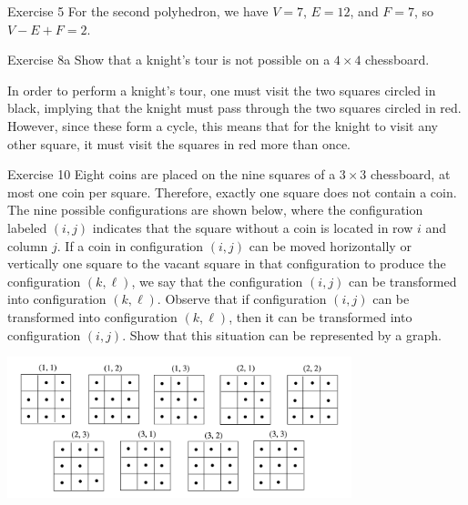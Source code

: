 \documentclass[8pt]{extarticle}
\begin{document}
{\begin{problem}{Exercise 5}
    For the second polyhedron, we have $V = 7$, $E = 12$, and $F = 7$, so $V-E+F = 2$.
  \end{problem}
  \begin{problem}{Exercise 8a}
    Show that a knight's tour is not possible on a $4\times 4$ chessboard.
    \tcblower
    \begin{center}
    \end{center}
    In order to perform a knight's tour, one must visit the two squares circled in black, implying that the knight must pass through the two squares circled in red. However, since these form a cycle, this means that for the knight to visit any other square, it must visit the squares in red more than once.
  \end{problem}
  \begin{problem}{Exercise 10}
    Eight coins are placed on the nine squares of a $3\times 3$ chessboard, at most one coin per square. Therefore, exactly one square does not contain a coin. The nine possible configurations are shown below, where the configuration labeled $(i,j)$ indicates that the square without a coin is located in row $i$ and column $j$. If a coin in configuration $(i,j)$ can be moved horizontally or vertically one square to the vacant square in that configuration to produce the configuration $(k,\ell)$, we say that the configuration $(i,j)$ can be transformed into configuration $(k,\ell)$. Observe that if configuration $(i,j)$ can be transformed into configuration $(k,\ell)$, then it can be transformed into configuration $(i,j)$. Show that this situation can be represented by a graph.
    \begin{center}
      \includegraphics[width=10cm]{exercise_10}

\end{center}
\end{problem}}
\end{document}

